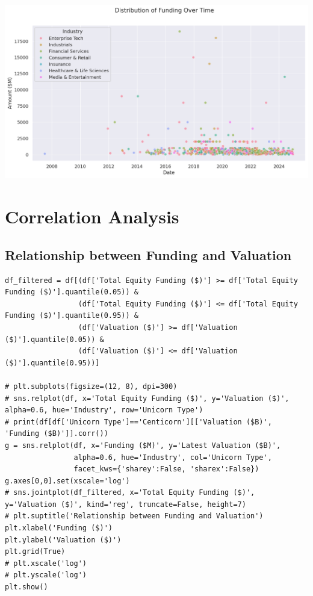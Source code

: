 \documentclass[a4paper,12pt]{article}
\begin{document}
\begin{center}
\includegraphics[width=.9\linewidth]{./.ob-jupyter/a358841530629a3897fd535343447d3cbaf3a4bb.png}
\label{}
\end{center}
\section{Correlation Analysis}
\label{sec:org04ab9fc}
\subsection{Relationship between Funding and Valuation}
\label{sec:orge1e8b68}

\begin{verbatim}
df_filtered = df[(df['Total Equity Funding ($)'] >= df['Total Equity Funding ($)'].quantile(0.05)) &
                 (df['Total Equity Funding ($)'] <= df['Total Equity Funding ($)'].quantile(0.95)) &
                 (df['Valuation ($)'] >= df['Valuation ($)'].quantile(0.05)) &
                 (df['Valuation ($)'] <= df['Valuation ($)'].quantile(0.95))]

# plt.subplots(figsize=(12, 8), dpi=300)
# sns.relplot(df, x='Total Equity Funding ($)', y='Valuation ($)', alpha=0.6, hue='Industry', row='Unicorn Type')
# print(df[df['Unicorn Type']=='Centicorn'][['Valuation ($B)', 'Funding ($B)']].corr())
g = sns.relplot(df, x='Funding ($M)', y='Latest Valuation ($B)',
                alpha=0.6, hue='Industry', col='Unicorn Type',
                facet_kws={'sharey':False, 'sharex':False})
g.axes[0,0].set(xscale='log')
# sns.jointplot(df_filtered, x='Total Equity Funding ($)', y='Valuation ($)', kind='reg', truncate=False, height=7)
# plt.suptitle('Relationship between Funding and Valuation')
plt.xlabel('Funding ($)')
plt.ylabel('Valuation ($)')
plt.grid(True)
# plt.xscale('log')
# plt.yscale('log')
plt.show()
\end{verbatim}
\end{document}
